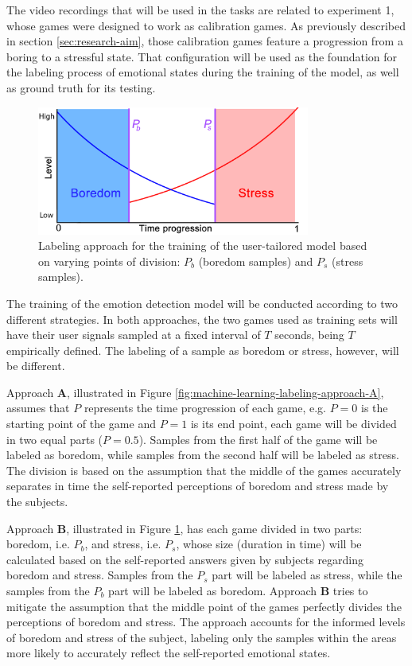 The video recordings that will be used in the tasks are related to experiment 1, whose games were designed to work as calibration games. As previously described in section \ref{sec:research-aim}, those calibration games feature a progression from a boring to a stressful state. That configuration will be used as the foundation for the labeling process of emotional states during the training of the model, as well as ground truth for its testing.

\begin{figure}[h]
    \centering
    \includegraphics[width=0.8\textwidth]{figures/machine-learning-labeling-approach-B.png}
    \caption{Labeling approach for the training of the user-tailored model based on varying points of division: $P_b$ (boredom samples) and $P_s$ (stress samples).}
    \label{fig:machine-learning-labeling-approach-B}
\end{figure}

The training of the emotion detection model will be conducted according to two different strategies. In both approaches, the two games used as training sets will have their user signals sampled at a fixed interval of $T$ seconds, being $T$ empirically defined. The labeling of a sample as boredom or stress, however, will be different.

Approach \textbf{A}, illustrated in Figure \ref{fig:machine-learning-labeling-approach-A}, assumes that $P$ represents the time progression of each game, e.g. $P=0$ is the starting point of the game and $P=1$ is its end point, each game will be divided in two equal parts ($P=0.5$). Samples from the first half of the game will be labeled as boredom, while samples from the second half will be labeled as stress. The division is based on the assumption that the middle of the games accurately separates in time the self-reported perceptions of boredom and stress made by the subjects.

Approach \textbf{B}, illustrated in Figure \ref{fig:machine-learning-labeling-approach-B}, has each game divided in two parts: boredom, i.e. $P_b$, and stress, i.e. $P_s$, whose size (duration in time) will be calculated based on the self-reported answers given by subjects regarding boredom and stress. Samples from the $P_s$ part will be labeled as stress, while the samples from the $P_b$ part will be labeled as boredom. Approach \textbf{B} tries to mitigate the assumption that the middle point of the games perfectly divides the perceptions of boredom and stress. The approach accounts for the informed levels of boredom and stress of the subject, labeling only the samples within the areas more likely to accurately reflect the self-reported emotional states.

